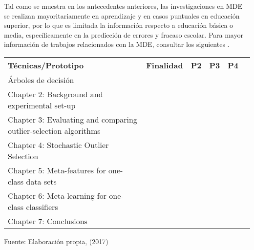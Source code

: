 Tal como se muestra en los antecedentes anteriores, las investigaciones en MDE se realizan mayoritariamente en aprendizaje  y en casos puntuales en educación superior, por lo que es limitada la información respecto a educación básica o media, específicamente en la predicción de errores y fracaso escolar. Para mayor información de trabajos relacionados con la MDE, consultar los siguientes  \parencite{shahiri2015review,sukhija2015recent,anoopkumar2016review,dutt2017systematic}.

\begin{table}[H]
\centering
{}
\begin{tabular}{lccccc}\toprule
Técnicas/Prototipo&Finalidad&P2&P3&P4\\
\midrule
\rowcolor[gray]{0.9}
Árboles de decisión									                & \y & \y & \y & \y \\
Chapter 2: Background and experimental set-up 						&    & \y & \y & \y \\
\rowcolor[gray]{0.9}
Chapter 3: Evaluating and comparing outlier-selection algorithms 	&    & \y &    &    \\
Chapter 4: Stochastic Outlier Selection 							&    &    & \y &    \\
\rowcolor[gray]{0.9}
Chapter 5: Meta-features for one-class data sets 					&    &    &    & \y \\
Chapter 6: Meta-learning for one-class classifiers 					&    &    &    & \y \\
\rowcolor[gray]{0.9}
Chapter 7: Conclusions  											& \y & \y & \y & \y \\
\bottomrule
\end{tabular}
\medskip
\par\centering Fuente: Elaboración propia, (2017)
\end{table}

